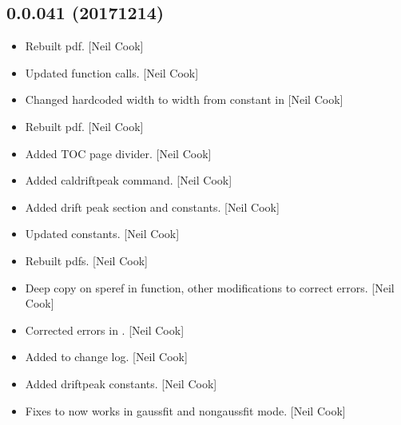 \documentclass[a4paper,10pt,english]{report}
\begin{document}
\subsection{0.0.041 (2017\sphinxhyphen{}12\sphinxhyphen{}14)}
\label{\detokenize{misc/changelog:id530}}\begin{itemize}
\item {} 
Rebuilt pdf. {[}Neil Cook{]}

\item {} 
Updated  function calls. {[}Neil Cook{]}

\item {} 
Changed hardcoded width to width from constant in  {[}Neil
Cook{]}

\item {} 
Rebuilt pdf. {[}Neil Cook{]}

\item {} 
Added TOC page divider. {[}Neil Cook{]}

\item {} 
Added caldriftpeak command. {[}Neil Cook{]}

\item {} 
Added drift peak section and constants. {[}Neil Cook{]}

\item {} 
Updated constants. {[}Neil Cook{]}

\item {} 
Rebuilt pdfs. {[}Neil Cook{]}

\item {} 
Deep copy on speref in  function, other modifications
to correct errors. {[}Neil Cook{]}

\item {} 
Corrected errors in . {[}Neil Cook{]}

\item {} 
Added to change log. {[}Neil Cook{]}

\item {} 
Added drift\sphinxhyphen{}peak constants. {[}Neil Cook{]}

\item {} 
Fixes to  \sphinxhyphen{} now works in gaussfit and non\sphinxhyphen{}gaussfit mode.
{[}Neil Cook{]}

\end{itemize}
\end{document}
